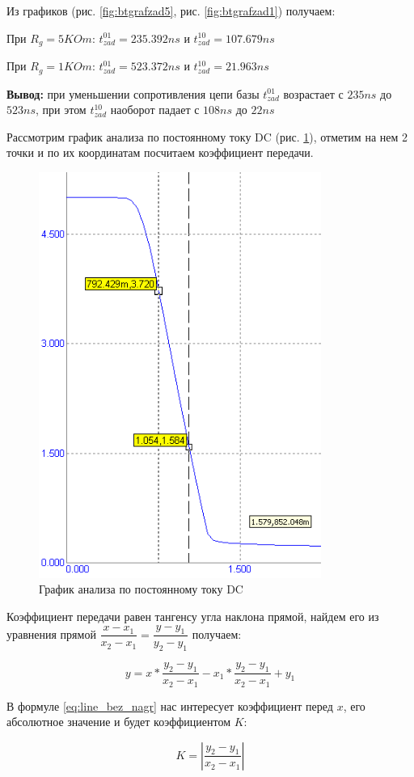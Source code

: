 \documentclass[a4paper,14pt]{article}
\begin{document}
Из графиков (рис. \ref{fig:btgrafzad5}, рис. \ref{fig:btgrafzad1}) получаем:

При $R_g = 5KOm$: $t^{01}_{zad} = 235.392ns$ и $t^{10}_{zad} = 107.679ns$

При $R_g = 1KOm$: $t^{01}_{zad} = 523.372ns$ и $t^{10}_{zad} = 21.963ns$

\textbf{Вывод:} при уменьшении сопротивления цепи базы $t^{01}_{zad}$ возрастает с $235ns$ до $523ns$, при этом  $t^{10}_{zad}$ наоборот падает с $108ns$ до $22ns$ 


Рассмотрим график анализа по постоянному току DC (рис. \ref{fig:btdc}), отметим на нем 2 точки и по их координатам посчитаем коэффициент передачи.

\begin{figure}[H]
	\centering
	\includegraphics[width=0.4\linewidth]{image/BT_DC}
	\caption{График анализа по постоянному току DC}
	\label{fig:btdc}
\end{figure}

Коэффициент передачи равен тангенсу угла наклона прямой, найдем его из уравнения прямой $\dfrac{x-x_1}{x_2 - x_1} = \dfrac{y-y_1}{y_2 - y_1}$ получаем:


\begin{equation}
y = x * \dfrac{y_2 - y_1}{x_2 - x_1} - x_1 * \dfrac{y_2 - y_1}{x_2 - x_1} + y_1
\label{eq:line_bez_nagr}
\end{equation}

В формуле \ref{eq:line_bez_nagr} нас интересует коэффициент перед $x$, его абсолютное значение и будет коэффициентом $K$: 

\begin{equation}
K = \left|\dfrac{y_2 - y_1}{x_2 - x_1}\right|
\label{eq:K_bez_nagr}
\end{equation}
\end{document}
